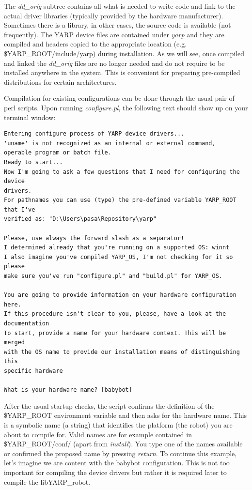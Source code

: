 The {\em dd\_orig} subtree contains all what is needed to write code and link to the actual driver libraries (typically provided by the hardware manufacturer). Sometimes there is a library, in other cases, the source code is available (not frequently). The YARP device files are contained under {\em yarp} and they are compiled and headers copied to the appropriate location (e.g. \$YARP\_ROOT/include/yarp) during installation. As we will see, once compiled and linked the {\em dd\_orig} files are no longer needed and do not require to be installed anywhere in the system. This is convenient for preparing pre-compiled distributions for certain architectures.

Compilation for existing configurations can be done through the usual pair of perl scripts. Upon running {\em configure.pl}, the following text should show up on your terminal window:

\begin{verbatim}
Entering configure process of YARP device drivers...
'uname' is not recognized as an internal or external command,
operable program or batch file.
Ready to start...
Now I'm going to ask a few questions that I need for configuring the device 
drivers.
For pathnames you can use (type) the pre-defined variable YARP_ROOT that I've 
verified as: "D:\Users\pasa\Repository\yarp"

Please, use always the forward slash as a separator!
I determined already that you're running on a supported OS: winnt
I also imagine you've compiled YARP_OS, I'm not checking for it so please 
make sure you've run "configure.pl" and "build.pl" for YARP_OS.

You are going to provide information on your hardware configuration here. 
If this procedure isn't clear to you, please, have a look at the 
documentation
To start, provide a name for your hardware context. This will be merged 
with the OS name to provide our installation means of distinguishing this 
specific hardware

What is your hardware name? [babybot]
\end{verbatim}

After the usual startup checks, the script confirms the definition of the \$YARP\_ROOT environment variable and then asks for the hardware name. This is a symbolic name (a string) that identifies the platform (the robot) you are about to compile for. Valid names are for example contained in \$YARP\_ROOT/conf/ (apart from {\em install}). You type one of the names available or confirmed the proposed name by pressing {\em return}. To continue this example, let's imagine we are content with the babybot configuration. This is not too important for compiling the device drivers but rather it is required later to compile the libYARP\_robot.

